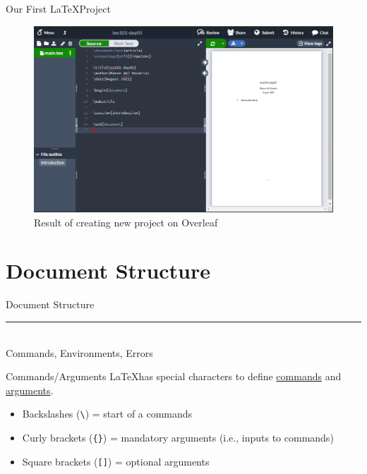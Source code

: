 \documentclass{beamer}
\begin{document}
{  \begin{frame}{Our First \LaTeX\;Project}
    \begin{figure}
      \includegraphics[width=0.9\linewidth]{day01-overleaf-01.png}
      \caption{Result of creating new project on Overleaf}
      \label{fig:day01-overleaf-01}
    \end{figure}
  \end{frame}

  \section{Document Structure}

  \begin{frame}[plain]
    \vfill
    \centering
    \begin{beamercolorbox}[sep=8pt,center,shadow=true,rounded=true]{Document Structure}
      \insertsectionhead\par%
      \color{davisblue}\noindent\rule{10cm}{1pt} \\
      \footnotesize{Commands, Environments, Errors}
    \end{beamercolorbox}
    \vfill
  \end{frame}

  \begin{frame}{Commands/Arguments}
    \LaTeX\;has special characters to define \underline{commands} and \underline{arguments}.
    \begin{itemize}
      \item Backslashes (\texttt{\textbackslash}) = start of a commands
      \item Curly brackets (\texttt{\{\}}) = mandatory arguments (i.e., inputs to commands)
      \item Square brackets (\texttt{[]}) = optional arguments
    \end{itemize}
  \end{frame}

}
\end{document}
